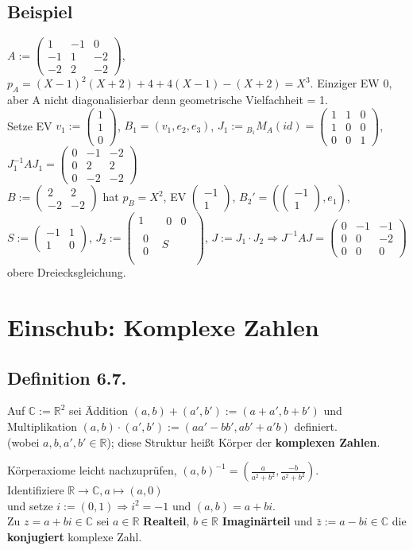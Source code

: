 \documentclass[a4paper, 12pt]{extarticle}
\newcommand{\twoXtwo}[4] {
	\left( 
	\begin{matrix}
		#1 & #2 \\
		#3 & #4
	\end{matrix} 
	\right)
}
\newcommand{\threeXthree}[9] {
	\left( 
	\begin{matrix}
		#1 & #2 & #3\\
		#4 & #5 & #6\\
		#7 & #8 & #9
	\end{matrix}
	\right)
}
\newcommand{\vecTwo}[2] {
	\left( 
	\begin{matrix}
		#1\\
		#2
	\end{matrix} 
	\right)
}
\newcommand{\vecThree}[3] {
	\left( 
	\begin{matrix}
		#1\\
		#2\\
		#3
	\end{matrix} 
	\right)
}
\begin{document}
\subsection*{Beispiel}
$A:= \threeXthree{1}{-1}{0}{-1}{1}{-2}{-2}{2}{-2}$, $p_A = (X-1)^2(X+2)+4+4(X-1)-(X+2)=X^3$. 
Einziger EW 0, aber A nicht diagonalisierbar denn geometrische Vielfachheit = 1. \\
Setze EV $v_1:= \vecThree{1}{1}{0}$, $B_1=(v_1, e_2, e_3)$, $J_1:= {}_{B_1}M_A(id) = \threeXthree{1}{1}{0}{1}{0}{0}{0}{0}{1}$, $J^{-1}_1AJ_1 = \threeXthree{0}{-1}{-2}{0}{2}{2}{0}{-2}{-2}$ \\
$B:= \twoXtwo{2}{2}{-2}{-2}$ hat $p_B = X^2$, EV $\vecTwo{-1}{1}$, $B_2'=(\vecTwo{-1}{1}, e_1)$, \\ $S:=\twoXtwo{-1}{1}{1}{0}$, $J_2:=\left( 
\begin{matrix}
	1 & \begin{matrix} 0 & 0 \end{matrix} \\
	\begin{matrix} 0 \\ 0 \end{matrix} & S\\
\end{matrix}
\right)$, $J:=J_1\cdot J_2 \Rightarrow J^{-1}AJ = \threeXthree{0}{-1}{-1}{0}{0}{-2}{0}{0}{0}$ obere Dreiecksgleichung.
\section*{Einschub: Komplexe Zahlen}
\subsection*{Definition 6.7.}
\begin{tabbing}
	Auf $\mathbb{C} := \mathbb{R}^2$ sei \=Addition $(a, b) + (a', b') := (a+a', b+b')$ und\\
	\>Multiplikation $(a, b) \cdot (a', b') := (aa'-bb', ab'+a'b)$ definiert.\\ (wobei $a, b, a', b' \in \mathbb{R}$); diese Struktur heißt Körper der \textbf{komplexen Zahlen}.
\end{tabbing}
Körperaxiome leicht nachzuprüfen, $(a, b)^{-1} = (\frac{a}{a^2+b^2}, \frac{-b}{a^2+b^2})$.\\
Identifiziere $\mathbb{R} \longrightarrow \mathbb{C}, a \longmapsto (a, 0)$\\ und setze $i := (0,1) \Rightarrow i^2 = -1$ und $(a, b) = a+bi$.\\
Zu $z = a+bi \in \mathbb{C}$ sei $a\in\mathbb{R}$ \textbf{Realteil}, $b\in\mathbb{R}$ \textbf{Imaginärteil} und $\bar{z} := a - bi \in \mathbb{C}$ die \textbf{konjugiert} komplexe Zahl.\\
\end{document}
